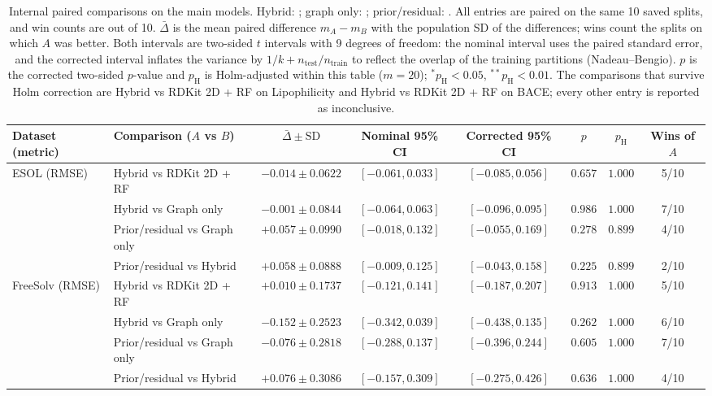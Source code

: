 \begin{table}[H]
\caption{Internal paired comparisons on the main models. Hybrid: ; graph only: ; prior/residual: . All entries are paired on the same 10 saved splits, and win counts are out of 10. $\bar\Delta$ is the mean paired difference $m_A-m_B$ with the population SD of the differences; wins count the splits on which $A$ was better. Both intervals are two-sided $t$ intervals with 9 degrees of freedom: the nominal interval uses the paired standard error, and the corrected interval inflates the variance by $1/k+n_{\mathrm{test}}/n_{\mathrm{train}}$ to reflect the overlap of the training partitions (Nadeau--Bengio). $p$ is the corrected two-sided $p$-value and $p_{\mathrm{H}}$ is Holm-adjusted within this table ($m=20$); $^{*}p_{\mathrm{H}}<0.05$, $^{**}p_{\mathrm{H}}<0.01$. The comparisons that survive Holm correction are Hybrid vs RDKit 2D + RF on Lipophilicity and Hybrid vs RDKit 2D + RF on BACE; every other entry is reported as inconclusive. }\label{tab:int}
\centering\scriptsize
\setlength{\tabcolsep}{2pt}
\begin{tabular}{@{}llcccccc@{}}
\toprule
Dataset (metric) & Comparison ($A$ vs $B$) & $\bar\Delta\pm\mathrm{SD}$ & Nominal 95\% CI & Corrected 95\% CI & $p$ & $p_{\mathrm{H}}$ & Wins of $A$ \\
\midrule
ESOL (RMSE) & Hybrid vs RDKit 2D + RF & $-0.014\pm0.0622$ & $[-0.061,0.033]$ & $[-0.085,0.056]$ & $0.657$ & $1.000$ & 5/10 \\
 & Hybrid vs Graph only & $-0.001\pm0.0844$ & $[-0.064,0.063]$ & $[-0.096,0.095]$ & $0.986$ & $1.000$ & 7/10 \\
 & Prior/residual vs Graph only & $+0.057\pm0.0990$ & $[-0.018,0.132]$ & $[-0.055,0.169]$ & $0.278$ & $0.899$ & 4/10 \\
 & Prior/residual vs Hybrid & $+0.058\pm0.0888$ & $[-0.009,0.125]$ & $[-0.043,0.158]$ & $0.225$ & $0.899$ & 2/10 \\
\midrule
FreeSolv (RMSE) & Hybrid vs RDKit 2D + RF & $+0.010\pm0.1737$ & $[-0.121,0.141]$ & $[-0.187,0.207]$ & $0.913$ & $1.000$ & 5/10 \\
 & Hybrid vs Graph only & $-0.152\pm0.2523$ & $[-0.342,0.039]$ & $[-0.438,0.135]$ & $0.262$ & $1.000$ & 6/10 \\
 & Prior/residual vs Graph only & $-0.076\pm0.2818$ & $[-0.288,0.137]$ & $[-0.396,0.244]$ & $0.605$ & $1.000$ & 7/10 \\
 & Prior/residual vs Hybrid & $+0.076\pm0.3086$ & $[-0.157,0.309]$ & $[-0.275,0.426]$ & $0.636$ & $1.000$ & 4/10 \\

\end{tabular}
\end{table}
